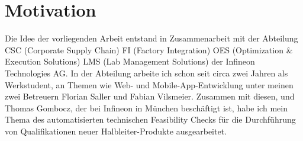 \section{Motivation}
Die Idee der vorliegenden Arbeit entstand in Zusammenarbeit mit der Abteilung CSC (Corporate Supply Chain) FI (Factory Integration) OES (Optimization \& Execution Solutions) LMS (Lab Management Solutions) der Infineon Technologies AG. 
In der Abteilung arbeite ich schon seit circa zwei Jahren als Werkstudent, an Themen wie Web- und Mobile-App-Entwicklung unter meinen zwei Betreuern Florian Saller und Fabian Vilsmeier.
Zusammen mit diesen, und Thomas Gombocz, der bei Infineon in München beschäftigt ist, habe ich mein Thema des automatisierten technischen Feasibility Checks für die Durchführung von Qualifikationen neuer Halbleiter-Produkte ausgearbeitet.